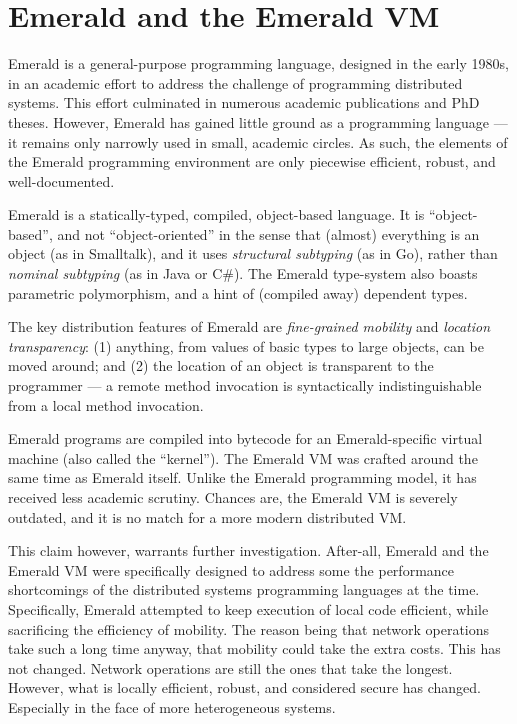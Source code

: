 \section{Emerald and the Emerald VM}

Emerald is a general-purpose programming language, designed in the
early 1980s, in an academic effort to address the challenge of
programming distributed systems. This effort culminated in numerous
academic publications\cite{emerald:tse:1987, emerald:tocs:1988,
emerald:spe:1991} and PhD theses\cite{emerald:phd:norman-c-hutchinson,
emerald:phd:eric-jul, emerald:phd:niels-christian-juul}. However,
Emerald has gained little ground as a programming language --- it
remains only narrowly used in small, academic circles. As such, the
elements of the Emerald programming environment are only piecewise
efficient, robust, and well-documented.

Emerald is a statically-typed, compiled, object-based language. It is
``object-based'', and not ``object-oriented'' in the sense that
(almost) everything is an object (as in Smalltalk), and it uses
\emph{structural subtyping} (as in Go), rather than \emph{nominal
subtyping} (as in Java or C\#). The Emerald type-system also boasts
parametric polymorphism, and a hint of (compiled away) dependent
types.

The key distribution features of Emerald are \emph{fine-grained
mobility} and \emph{location transparency}: (1) anything, from values
of basic types to large objects, can be moved around; and (2) the
location of an object is transparent to the programmer --- a remote
method invocation is syntactically indistinguishable from a local
method invocation.

Emerald programs are compiled into bytecode for an Emerald-specific
virtual machine (also called the
``kernel''\cite{emerald:phd:eric-jul}). The Emerald VM was crafted
around the same time as Emerald itself.  Unlike the Emerald
programming model, it has received less academic scrutiny. Chances
are, the Emerald VM is severely outdated, and it is no match for a
more modern distributed VM.

This claim however, warrants further investigation. After-all, Emerald
and the Emerald VM were specifically designed to address some the
performance shortcomings of the distributed systems programming
languages at the time\cite{emerald:phd:eric-jul}. Specifically,
Emerald attempted to keep execution of local code efficient, while
sacrificing the efficiency of mobility. The reason being that network
operations take such a long time anyway, that mobility could take the
extra costs. This has not changed. Network operations are still the
ones that take the longest. However, what is locally efficient,
robust, and considered secure has changed. Especially in the face of
more heterogeneous systems.
